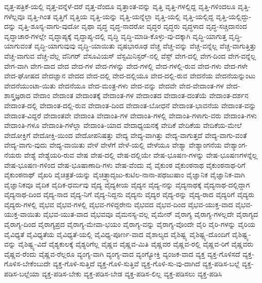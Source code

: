 {ವೃತ್ತ-ಪತ್ರಿಕೆ-ಯಲ್ಲಿ
ವೃತ್ತ-ವನ್ನೆಳೆ-ದರೆ
ವೃತ್ತ-ವೆಂದೂ
ವೃತ್ತಾಂತ-ವನ್ನು
ವೃತ್ತಿ
ವೃತ್ತಿ-ಗಳಲ್ಲಿದ್ದ
ವೃತ್ತಿ-ಗಳಿಂದಲೂ
ವೃತ್ತಿ-ಗಳೆಲ್ಲವೂ
ವೃತ್ತಿ-ಗಿಂತ
ವೃತ್ತಿಗೆ
ವೃತ್ತಿಯ
ವೃತ್ತಿ-ಯನ್ನು
ವೃತ್ತಿ-ಯನ್ನೆಲ್ಲಾ
ವೃತ್ತಿ-ಯಲ್ಲಿ
ವೃತ್ತಿ-ಯಲ್ಲಿದ್ದ
ವೃತ್ತಿ-ಯಲ್ಲಿದ್ದು-ದನ್ನು
ವೃತ್ತಿ-ಶೂನ್ಯ-ವಾಗು-ವುದೋ
ವೃಥಾ
ವೃದ್ಧ
ವೃದ್ಧ-ನಾದರೋ
ವೃದ್ಧರ
ವೃದ್ಧರು
ವೃದ್ಧಳಾದ
ವೃದ್ಧ-ಸಚ್ಚಿದಾನಂದ
ವೃದ್ಧಾಚಾರ-ಗಳಲ್ಲೇ
ವೃದ್ಧಾಪ್ಯಕ್ಕೆ
ವೃದ್ಧಾಪ್ಯ-ದಲ್ಲಿ
ವೃದ್ಧಿ
ವೃದ್ಧಿ-ಮಾಡಿ-ಕೊಳ್ಳು-ವು-ದಕ್ಕಾಗಿ
ವೃದ್ಧಿ-ಯಾಗುತ್ತ
ವೃದ್ಧಿ-ಯಾಗುವಂತೆ
ವೃದ್ಧಿ-ಯಾಗುವುವು
ವೃದ್ಧಿ-ಯಾಯಿತು
ವೃಷಭಾರೂಢ
ವೆಚ್ಚ
ವೆಚ್ಚ-ವನ್ನು
ವೆಚ್ಚ-ವನ್ನೆಲ್ಲ
ವೆಚ್ಚ-ವಾಗುತ್ತಿತ್ತು
ವೆಚ್ಚ-ವಾಗುವ
ವೆಚ್ಚ-ವೆಲ್ಲ
ವೆನಿಗರ್
ವೆಸೂವಿಯಸ್
ವೆಸ್ಟಮಿನಿಸ್ಟರ್-ನಲ್ಲಿ
ವೆಸ್ಟ್
ವೇಗ-ದಲ್ಲಿ
ವೇಗ-ದಿಂದ
ವೇಗ-ವನ್ನೆಲ್ಲ
ವೇಗ-ವಾಗಿ
ವೇಗ-ವಾದ
ವೇದ
ವೇದ-ಗಳ
ವೇದ-ಗಳನ್ನು
ವೇದ-ಗಳಲ್ಲಿ
ವೇದ-ಗಳಲ್ಲಿ-ರುವ
ವೇದ-ಗಳು
ವೇದ-ಗಳೇ
ವೇದ-ಘೋಷದ
ವೇದಜ್ಞಾನ
ವೇದದ
ವೇದ-ದಲ್ಲಿ
ವೇದ-ದಲ್ಲಿಯೂ
ವೇದ-ದಲ್ಲಿ-ರುವ
ವೇದನೆಯ
ವೇದನೆಯನ್ನುಂಟು
ವೇದನೆಯುಂಟಾ-ಯಿತು
ವೇದನೆಯೂ
ವೇದ-ಮಂತ್ರ-ಗಳು
ವೇದ-ವನ್ನು
ವೇದವೇ
ವೇದ-ವೇದಾಂತ-ಗಳ
ವೇದ-ಶಾಸ್ತ್ರಜ್ಞರಾದ
ವೇದಾಂ
ವೇದಾಂತ
ವೇದಾಂತಕ್ಕೆ
ವೇದಾಂತ-ಗಳ
ವೇದಾಂತದ
ವೇದಾಂತ-ದಂತೆಯೆ
ವೇದಾಂತ-ದರ್ಶನ
ವೇದಾಂತ-ದಲ್ಲಿ
ವೇದಾಂತ-ದಲ್ಲಿ-ರುವ
ವೇದಾಂತ-ದಿಂದ
ವೇದಾಂತ-ಬೋಧನೆ
ವೇದಾಂತ-ಭಾವನೆಯ
ವೇದಾಂತ-ವನ್ನು
ವೇದಾಂತ-ವಿದ್ದರೆ
ವೇದಾಂತವೇ
ವೇದಾಂತಿ
ವೇದಾಂತಿ-ಗಳ
ವೇದಾಂತಿ-ಗಳಲ್ಲಿ
ವೇದಾಂತಿ-ಗಳಾಗು-ವರು
ವೇದಾಂತಿ-ಗಳು
ವೇದಾಂತಿ-ಗಳೂ
ವೇದಾಂತಿ-ಗಳೆಲ್ಲಾ
ವೇದಾಂತಿ-ಯಾದ
ವೇದಾಧ್ಯಯನಕ್ಕೆ
ವೇದಿಕೆ
ವೇದಿಕೆಯ
ವೇದಿಕೆಯ-ಮೇಲೆ
ವೇದೋಕ್ತಿಗೆ
ವೇದೋಕ್ತಿ-ಯಿಂದ
ವೇದೋಪನಿಷತ್ತು
ವೇದ್ಯ
ವೇದ್ಯ-ವಾಗಿತ್ತು
ವೇದ್ಯ-ವಾಗುತ್ತದೆ
ವೇದ್ಯ-ವಾಗು-ವಂತೆ
ವೇದ್ಯ-ವಾಗು-ವುದು
ವೇದ್ಯ-ವಾಯಿತು
ವೇಳೆ
ವೇಳೆಗೆ
ವೇಳೆ-ಯಲ್ಲಿ
ವೇಳೆಯೂ
ವೇಶ್ಯಾ
ವೇಶ್ಯಾಂಗನೆಯ
ವೇಶ್ಯಾಂಗ-ನೆಯರು
ವೇಶ್ಯೆ
ವೇಶ್ಯೆಯರಿ-ರುವ
ವೇಷ
ವೇಷ-ದಲ್ಲಿ
ವೇಷ-ದಲ್ಲಿಯೇ
ವೇಷ-ಭೂಷಣ-ಗಳನ್ನು
ವೇಷ-ಭೂಷಣಗಳನ್ನೆಲ್ಲ
ವೇಷ-ಭೂಷಣ-ಗಳಿಂದ
ವೇಷ-ಭೂಷಾಣಾದಿ-ಗಳು
ವೇಷ-ವೆಂದು
ವೈ
ವೈಕುಂಠ
ವೈಕುಂಠನಾಥ
ವೈಕುಂಠನಾಥ-ರಿಗೆ
ವೈಕುಂಠನಾಥ್
ವೈಖರಿ
ವೈಚಿತ್ರತೆ-ಯನ್ನು
ವೈಚಿತ್ರ್ಯಾದೃಜು-ಕುಟಿಲ-ನಾನಾ-ಪಥಜುಷಾಂ
ವೈಜ್ಞಾನಿಕ
ವೈಜ್ಞಾನಿಕ-ವಾಗಿ
ವೈಜ್ಞಾನಿಕವೂ
ವೈದಿಕ
ವೈದಿಕ-ಧರ್ಮವು
ವೈದ್ಯ
ವೈದ್ಯಕೀಯ
ವೈದ್ಯನ
ವೈದ್ಯ-ನನ್ನು
ವೈದ್ಯನಾಥಕ್ಕೆ
ವೈದ್ಯನಾಥ-ದಲ್ಲಿದ್ದಾಗ
ವೈದ್ಯನಾಥ-ದಿಂದ
ವೈದ್ಯ-ನಾದ
ವೈದ್ಯ-ನಿಗೆ
ವೈದ್ಯ-ನಿದ್ದನು
ವೈದ್ಯನು
ವೈದ್ಯರ
ವೈದ್ಯ-ರನ್ನು
ವೈದ್ಯ-ರಾದ
ವೈದ್ಯರಿಗೆ
ವೈದ್ಯರು
ವೈದ್ಯರು-ಗಳಲ್ಲಿ
ವೈಭವ
ವೈಭವ-ಗಳಲ್ಲಿ
ವೈಭವ-ಗಳಿದ್ದರೇನು
ವೈಭವದ
ವೈಭವ-ದಿಂದ
ವೈಭವ-ಯುಕ್ತ-ವಾದ
ವೈಭವ-ಯುಕ್ತ-ವಾಯಿತು
ವೈಭವ-ಯುತ-ವಾದ
ವೈಭವವೂ
ವೈಮನಸ್ಯ-ವಲ್ಲ
ವೈಮೇನ್
ವೈರಾಗ್ಯ
ವೈರಾಗ್ಯ-ಗಳಲ್ಲದೇ
ವೈರಾಗ್ಯದ
ವೈರಾಗ್ಯ-ದಿಂದ
ವೈರಾಗ್ಯಪ್ರದ
ವೈರಾಗ್ಯ-ಮೇವಾ-ಭಯಂ
ವೈರಾಗ್ಯ-ವನ್ನು
ವೈರಾಗ್ಯ-ವೊಂದೇ
ವೈರಿ
ವೈರಿ-ಗಳನ್ನು
ವೈರಿಯ
ವೈವಿಧ್ಯತೆ
ವೈವಿಧ್ಯತೆಯ
ವೈವಿಧ್ಯತೆ-ಯಲ್ಲಿ
ವೈವಿಧ್ಯ-ಪೂರ್ಣ-ವಾದ
ವೈಶಾಲ್ಯದ
ವೈಶಿಷ್ಟ್ಯ
ವೈಶಿಷ್ಟ್ಯ-ದೊಂದಿಗೆ
ವೈಶಿಷ್ಟ್ಯ-ವನ್ನು
ವೈಶಿಷ್ಟ್ಯ-ವಿದೆ
ವೈಶ್ಯಕುಲಕ್ಕೆ
ವೈಶ್ಯರಿಗೆಲ್ಲ
ವೈಷ್ಣವ
ವೈಷ್ಣವ-ಮಿತಿ
ವೈಷ್ಣವರ
ವೈಷ್ಣವ-ರಲ್ಲಿ
ವೈಷ್ಣವ-ರಿಗೆ
ವೈಷ್ಣವರು
ವೈಷ್ಣವ-ರೆಂದು
ವೈಷ್ಣವ-ರೆಲ್ಲರೂ
ವ್ಯಂಗ್ಯ-ವಾಗಿ
ವ್ಯಂಗ್ಯ-ವಾದ
ವ್ಯಂಗ್ಯೋಕ್ತಿ
ವ್ಯಂಜಕ-ವಾದ
ವ್ಯಕ್ತ
ವ್ಯಕ್ತ-ಗೊಳಿಸದೆ
ವ್ಯಕ್ತ-ಗೊಳಿಸ-ಬೇಕೆಂಬುದೇ
ವ್ಯಕ್ತ-ಗೊಳಿ-ಸುತ್ತಿದೆ
ವ್ಯಕ್ತ-ಗೊಳಿ-ಸುತ್ತಿವೆ
ವ್ಯಕ್ತ-ಗೊಳಿ-ಸು-ವು-ದಾಗಿದೆ
ವ್ಯಕ್ತ-ಪಡಿಸ-ಬಲ್ಲೆ
ವ್ಯಕ್ತ-ಪಡಿಸ-ಬಲ್ಲೆಯಾ
ವ್ಯಕ್ತ-ಪಡಿಸ-ಬೇಕು
ವ್ಯಕ್ತ-ಪಡಿಸ-ಬೇಡ
ವ್ಯಕ್ತ-ಪಡಿಸ-ಲಿಲ್ಲ
ವ್ಯಕ್ತ-ಪಡಿಸಲು
ವ್ಯಕ್ತ-ಪಡಿಸಿ
}
